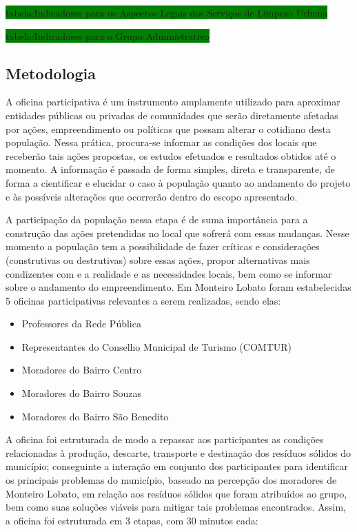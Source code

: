 	\colorbox{green}{tabela:Indicadores para os Aspectos Legais dos Serviços de Limpeza Urbana}
	
	\colorbox{green}{tabela:Indicadores para o Grupo Administrativo}
	
	
	
	\subsection{Metodologia}
	A oficina participativa é um instrumento amplamente utilizado para aproximar entidades públicas ou privadas de comunidades que serão diretamente afetadas por ações, empreendimento ou políticas que possam alterar o cotidiano desta população. Nessa prática, procura-se informar as condições dos locais que receberão tais ações propostas, os estudos efetuados e resultados obtidos até o momento. A informação é passada de forma simples, direta e transparente, de forma a cientificar e elucidar o caso à população quanto ao andamento do projeto e às possíveis alterações que ocorrerão dentro do escopo apresentado. 
	
	A participação da população nessa etapa é de suma importância para a construção das ações pretendidas no local que sofrerá com essas mudanças. Nesse momento a população tem a possibilidade de fazer críticas e considerações (construtivas ou destrutivas) sobre essas ações, propor alternativas mais condizentes com e a realidade e as necessidades locais, bem como se informar sobre o andamento do empreendimento.
	Em Monteiro Lobato foram estabelecidas 5 oficinas participativas relevantes a serem realizadas, sendo elas:
	
	\begin{itemize}
		\item Professores da Rede Pública
		\item Representantes do Conselho Municipal de Turismo (COMTUR)
		\item Moradores do Bairro Centro
		\item Moradores do Bairro Souzas
		\item Moradores do Bairro São Benedito
	\end{itemize}
	
	A oficina foi estruturada de modo a repassar aos participantes as condições relacionadas à produção, descarte, transporte e destinação dos resíduos sólidos do município; conseguinte a interação em conjunto dos participantes para identificar os principais problemas do município, baseado na percepção dos moradores de Monteiro Lobato, em relação aos resíduos sólidos que foram atribuídos ao grupo, bem como suas soluções viáveis para mitigar tais problemas encontrados. Assim, a oficina foi estruturada em 3 etapas, com 30 minutos cada: 
	
